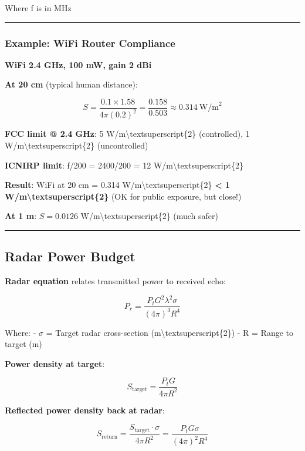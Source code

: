 Where f is in MHz

\begin{center}\rule{0.5\linewidth}{0.5pt}\end{center}

\subsubsection{Example: WiFi Router
Compliance}\label{example-wifi-router-compliance}

\textbf{WiFi 2.4 GHz, 100 mW, gain 2 dBi}

\textbf{At 20 cm} (typical human distance):

\[
S = \frac{0.1 \times 1.58}{4\pi (0.2)^2} = \frac{0.158}{0.503} \approx 0.314\ \text{W/m}^2
\]

\textbf{FCC limit @ 2.4 GHz}: 5 W/m\textbackslash textsuperscript\{2\}
(controlled), 1 W/m\textbackslash textsuperscript\{2\} (uncontrolled)

\textbf{ICNIRP limit}: f/200 = 2400/200 = 12
W/m\textbackslash textsuperscript\{2\}

\textbf{Result}: WiFi at 20 cm = 0.314
W/m\textbackslash textsuperscript\{2\} \textbf{\textless{} 1
W/m\textbackslash textsuperscript\{2\}} (OK for public exposure, but
close!)

\textbf{At 1 m}: \(S = 0.0126\) W/m\textbackslash textsuperscript\{2\}
(much safer)

\begin{center}\rule{0.5\linewidth}{0.5pt}\end{center}

\subsection{Radar Power Budget}\label{radar-power-budget}

\textbf{Radar equation} relates transmitted power to received echo:

\[
P_r = \frac{P_t G^2 \lambda^2 \sigma}{(4\pi)^3 R^4}
\]

Where: - \(\sigma\) = Target radar cross-section
(m\textbackslash textsuperscript\{2\}) - R = Range to target (m)

\textbf{Power density at target}:

\[
S_{\text{target}} = \frac{P_t G}{4\pi R^2}
\]

\textbf{Reflected power density back at radar}:

\[
S_{\text{return}} = \frac{S_{\text{target}} \cdot \sigma}{4\pi R^2} = \frac{P_t G \sigma}{(4\pi)^2 R^4}
\]


